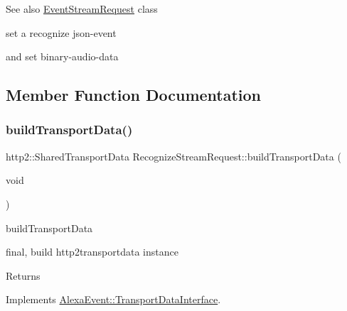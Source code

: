 \begin{DoxySeeAlso}{See also}
\hyperlink{classAlexaEvent_1_1EventStreamRequest}{Event\+Stream\+Request} class
\end{DoxySeeAlso}

\begin{DoxyItemize}
\item set a recognize json-\/event
\item and set binary-\/audio-\/data 
\end{DoxyItemize}

\subsection{Member Function Documentation}
\mbox{\label{classAlexaEvent_1_1RecognizeStreamRequest_a3cfc29f048599f83b465eade796a4b5d}} 
\subsubsection{\texorpdfstring{build\+Transport\+Data()}{buildTransportData()}}
{\footnotesize\ttfamily http2\+::\+Shared\+Transport\+Data Recognize\+Stream\+Request\+::build\+Transport\+Data (\begin{DoxyParamCaption}\item[{void}]{ }\end{DoxyParamCaption})\hspace{0.3cm}{\ttfamily [virtual]}}



build\+Transport\+Data 

final, build http2transportdata instance \begin{DoxyReturn}{Returns}

\end{DoxyReturn}


Implements \hyperlink{classAlexaEvent_1_1TransportDataInterface}{Alexa\+Event\+::\+Transport\+Data\+Interface}.

\mbox{\label{classAlexaEvent_1_1RecognizeStreamRequest_ade8ad7f62497adfd0799f176db7b8963}} 
